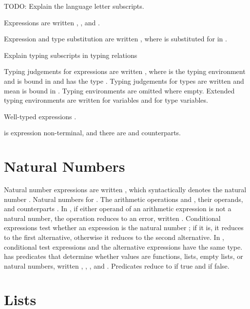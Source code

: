 TODO: Explain the language letter subscripts.

Expressions are written \varexph, \varexpm, and \varexps.

Expression and type substitution are written , where  is substituted for  in .

Explain typing subscripts in typing relations

Typing judgements for expressions are written \judeh{\env}{\varexph}{\vartyh}, where \env is the typing environment and \varexph is bound in \env and has the type \vartyh. Typing judgements for types are written \judth{\env}{\vartyh} and mean \vartyh is bound in \env. Typing environments are omitted where empty. Extended typing environments are written \envexte{\env}{\varvarh}{\vartyh} for variables and \envextt{\env}{\tyvarh} for type variables.

Well-typed \scheme expressions \havetype{\tytst}.

\varexph is \thehaskell expression non-terminal, and there are \ml and \scheme counterparts.

\section{Natural Numbers}

Natural number expressions are written \expnum{\varnum}, which syntactically denotes the natural number \varnum. Natural numbers \havetype{\tynum} for \thehaskellml. The arithmetic operations \expadd{\varexph}{\varexph} and \expsub{\varexph}{\varexph}, their operands, and \theml counterparts \havetype{\tynum}. In \thescheme, if either operand of an arithmetic expression is not a natural number, the operation reduces to an error, written \expwrongd{\errnum}. Conditional expressions test whether an expression is the natural number ; if it is, it reduces to the first alternative, otherwise it reduces to the second alternative. In \thehaskellml, conditional test expressions \havetype{\tynum} and the alternative expressions have the same type. \Thescheme has predicates that determine whether values are functions, lists, empty lists, or natural numbers, written \exppfun{\varexps}, \expplist{\varexps}, \exppnull{\varexps}, and \exppnum{\varexps}. Predicates reduce to  if true and  if false.

\section{Lists}

